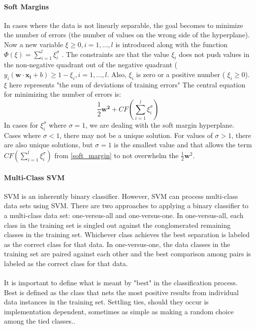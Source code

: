 			\paragraph{Soft Margins}
			In cases where the data is not linearly separable, the goal becomes to minimize the number of errors (the number of values on the wrong side of the hyperplane).  Now a new variable $\xi \ge 0, i=1,...,l$ is introduced along with the function $\Phi (\xi) = \sum_{i=1}^{l} \xi_{i}^{\sigma}$ .  The constraints are that the value 
			$\xi_i$ does not push values in the non-negative quadrant out of the negative quadrant ( $y_i(\mathbf{w} \cdot \mathbf{x_i} + b) \ge 1 - \xi_i, i=1,...,l$.  Also, $\xi_i$ is zero or a positive number ( $\xi_i \ge 0$).  $\xi$ here represents "the sum of deviations of training errors"
			The central equation for minimizing the number of errors is:
			\begin{equation}\label{soft_margin}  \frac{1}{2}\mathbf{w^2} + CF(\sum_{i=1}^{l} \xi_{i}^\sigma)\end{equation}
			In cases for $ \xi_{i}^{\sigma} $ where $\sigma=1$, we are dealing with the soft margin hyperplane.  Cases where $\sigma < 1$, there may not be a unique solution.  For values of $\sigma > 1$, there are also unique solutions, but $\sigma =1$ is the smallest value and that allows the term $CF(\sum_{i=1}^{l} \xi_{i}^\sigma)$ from \eqref{soft_margin} to not overwhelm  the $\frac{1}{2}\mathbf{w}^2$.\cite{vapnik_support-vector_1995}
			\paragraph{Multi-Class SVM}  SVM is an inherently binary classifier.  However, SVM can process multi-class data sets using SVM.  There are two approaches to applying a binary classifier to a multi-class data set: one-versus-all and one-versus-one.  In one-versus-all, each class in the training set is singled out against the conglomerated remaining classes in the training set.  Whichever class achieves the best separation is labeled as the correct class for that data.  In one-versus-one, the data classes in the training set are paired against each other and the best comparison among pairs is labeled as the correct class for that data.  
			\paragraph{} It is important to define what is meant by "best" in the classification process.  Best is defined as the class that nets the most positive results from individual data instances in the training set. Settling ties, should they occur is implementation dependent, sometimes as simple as making a random choice among the tied classes.\cite{_multiclass_????}.

